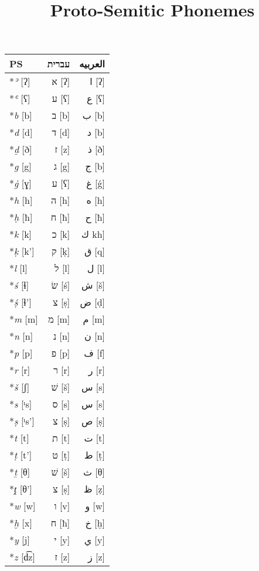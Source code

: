 \documentclass[border=0.25in]{standalone}
\begin{document}
\title{Proto-Semitic Phonemes}
\begin{tabular}{@{}lrr@{}}
  \toprule
  PS              & \texthebrew{עברית} & \textarabic{العربيه} \\
  \midrule
  \**\textit{ʾ} [ʔ]   & \texthebrew{א} [ʔ] & \textarabic{ا} [ʔ] \\
  \**\textit{ʿ} [ʕ]   & \texthebrew{ע} [ʕ] & \textarabic{ع} [ʕ] \\
  \**\textit{b} [b]   & \texthebrew{ב} [b] & \textarabic{ب} [b] \\
  \**\textit{d} [d]   & \texthebrew{ד} [d] & \textarabic{د} [b] \\
  \**\textit{ḏ} [ð]   & \texthebrew{ז} [z] & \textarabic{ذ} [ð] \\
  \**\textit{g} [g]   & \texthebrew{ג} [g] & \textarabic{ج} [b] \\
  \**\textit{ġ} [ɣ]   & \texthebrew{ע} [ʕ] & \textarabic{غ} [\'{g}] \\
  \**\textit{h} [h]   & \texthebrew{ה} [h] & \textarabic{ه} [h] \\ 
  \**\textit{ḥ} [ħ]   & \texthebrew{ח} [ħ] & \textarabic{ح} [ħ] \\
  \**\textit{k} [k]   & \texthebrew{כ} [k] & \textarabic{ك} kh] \\
  \**\textit{ḳ} [k']  & \texthebrew{ק} [ḳ] & \textarabic{ق} [q]\\
  \**\textit{l} [l]   & \texthebrew{ל} [l] & \textarabic{ل} [l]\\
  \**\textit{ś} [ɬ]   & \texthebrew{שׂ} [ś] & \textarabic{ش} [š]\\
  \**\textit{ṣ́} [ɬ']  & \texthebrew{צ} [ṣ] & \textarabic{ض} [ḍ]\\
  \**\textit{m} [m]   & \texthebrew{מ} [m] & \textarabic{م} [m]\\
  \**\textit{n} [n]   & \texthebrew{נ} [n] & \textarabic{ن} [n]\\
  \**\textit{p} [p]   & \texthebrew{פ} [p] & \textarabic{ف} [f]\\
  \**\textit{r} [r]   & \texthebrew{ר} [r] & \textarabic{ر} [r]\\
  \**\textit{š} [ʃ]   & \texthebrew{שׁ} [š] & \textarabic{س} [s]\\
  \**\textit{s} [ᵗs]  & \texthebrew{ס} [s] & \textarabic{س} [s]\\
  \**\textit{ṣ} [ᵗs'] & \texthebrew{צ} [ṣ] & \textarabic{ص} [ṣ]\\
  \**\textit{t} [t]   & \texthebrew{ת} [t] & \textarabic{ت} [t]\\
  \**\textit{ṭ} [t']  & \texthebrew{ט} [ṭ] & \textarabic{ط} [ṭ]\\
  \**\textit{ṯ} [θ]   & \texthebrew{שׁ} [š] & \textarabic{ث} [θ]\\
  \**\textit{ṱ} [θ']  & \texthebrew{צ} [ṣ] & \textarabic{ظ} [ẓ]\\
  \**\textit{w} [w]   & \texthebrew{ו} [v] & \textarabic{و} [w]\\
  \**\textit{ḫ} [x]   & \texthebrew{ח} [ħ] & \textarabic{خ} [ḫ]\\
  \**\textit{y} [j]   & \texthebrew{י} [y] & \textarabic{ي} [y]\\
  \**\textit{z} [d͡z]  & \texthebrew{ז} [z] & \textarabic{ز} [z]\\
  \bottomrule
\end{tabular}
\end{document}
